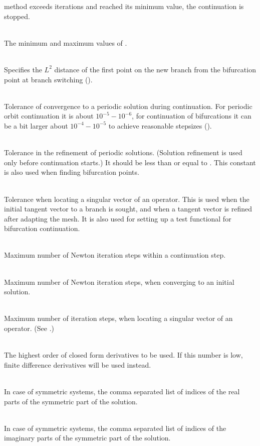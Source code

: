 \documentclass[10pt,a4paper]{ddedoc}
\begin{document}
\begin{description}
method exceeds  iterations and  reached its minimum value,
the continuation is stopped.
%
\item[\funp{dsmin}, \funp{dsmax}] ~\\
The minimum and maximum values of .
%
\item[\funp{dsstart}] ~\\
Specifies the $L^2$ distance of the first point on the new branch from the bifurcation 
point at branch switching ().
%
\item[\funp{epsc}] ~\\
Tolerance of convergence to a periodic solution during continuation. For
periodic orbit continuation it is about $10^{-5} - 10^{-6}$, for continuation of
bifurcations it can be a bit larger about $10^{-4} - 10^{-5}$ to achieve
reasonable stepsizes ().
%
\item[\funp{epsr}] ~\\
Tolerance in the refinement of periodic solutions. (Solution refinement is used
only before continuation starts.) It should be less than or equal to
. This constant is also used when finding bifurcation points.
%
\item[\funp{epsk}] ~\\
Tolerance when locating a singular vector of an operator. This is used when the initial tangent vector to a branch is sought,
and when a tangent vector is refined after adapting the mesh. It is also used for setting up a test functional for bifurcation continuation.
%
\item[\funp{nitc}] ~\\
Maximum number of Newton iteration steps within a continuation step.
%
\item[\funp{nitr}] ~\\
Maximum number of Newton iteration steps, when converging to an initial
solution.
%
\item[\funp{nitk}] ~\\
Maximum number of iteration steps, when locating a singular vector of an operator. (See .)
%
\item[\funp{nderi}] ~\\
The highest order of closed form derivatives to be used. If this number is low, finite difference derivatives will be used instead.
%
\item[\funp{symre}] ~\\
In case of symmetric systems, the comma separated list of indices of the real parts of the symmetric part of the solution.
%
\item[\funp{symim}] ~\\
In case of symmetric systems, the comma separated list of indices of the imaginary parts of the symmetric part of the solution.
\end{description}
\end{document}
